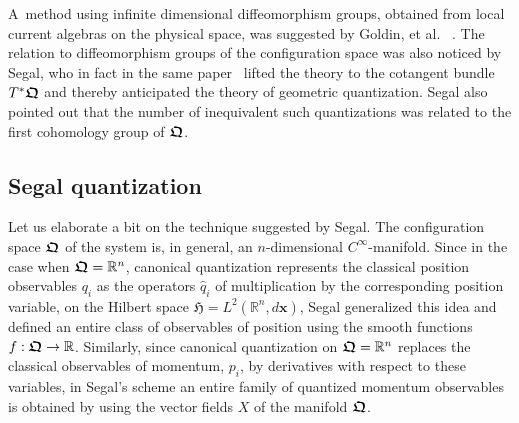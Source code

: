 \documentclass[11pt]{amsart}
\numberwithin{equation}{section}
\theoremstyle{remark}
\newcommand\HH{\mathfrak H}
\newcommand{\bfrakQ}{\mbox{\boldmath $\mathfrak Q$}}
\newcommand{\bx}{\mathbf x}
\begin{document}
A~method using infinite dimensional diffeomorphism groups, obtained from local
current algebras on the physical space, was suggested by
Goldin, et al. ~\cite{bib:gol1,bib:-golmensh2,bib:-golmensh1}.
The relation to diffeomorphism groups of the configuration space was also
noticed by Segal, who in fact in
the same paper~\cite{bib:Segal} lifted the theory to the cotangent bundle
$T^{*}\bfrakQ$ and thereby anticipated the theory of geometric quantization.
Segal also pointed out that the number of inequivalent such
quantizations was related to the first cohomology group of $\bfrakQ$.

\subsection{Segal quantization}\label{subsec-segquant}

Let us elaborate a bit on the technique suggested by Segal. The configuration
space $\bfrakQ$ of the system is, in general, an $n$-dimensional
$C^\infty$-manifold. Since in the case when $\bfrakQ = {\mathbb R}^n$,
canonical quantization represents the classical position observables $q_i$ as
the operators $\widehat{q}_i$ of multiplication by the corresponding position
variable, on the  Hilbert space $\HH = L^2 ({\mathbb R}^n , d\bx )$, Segal
generalized this idea and  defined an entire class of observables of
position  using the smooth functions $f: \bfrakQ \rightarrow {\mathbb R}$.
Similarly, since canonical quantization on $\bfrakQ = {\mathbb R}^n$
replaces the classical observables of momentum, $p_i$, by derivatives with
respect to these variables, in Segal's scheme an entire family of quantized
momentum observables is obtained by using the vector fields $X$ of the manifold
$\bfrakQ$.
\end{document}
